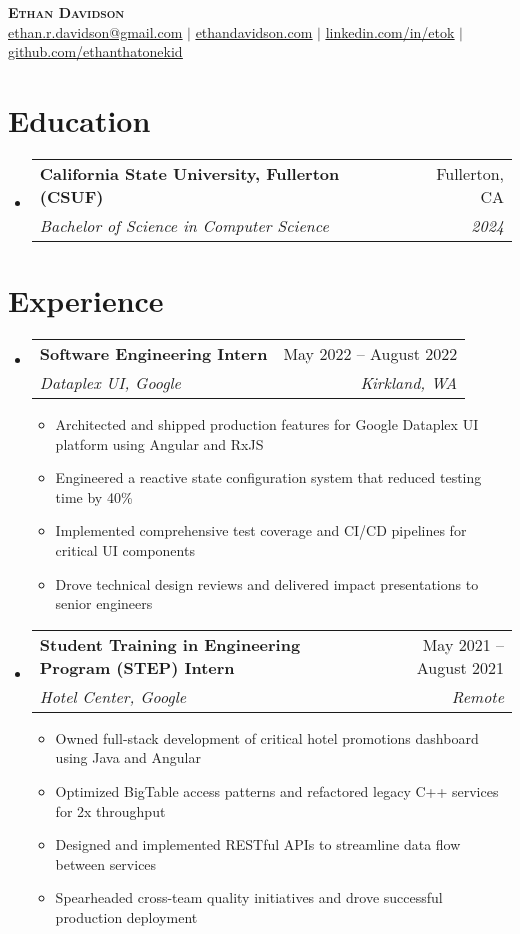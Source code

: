 \documentclass[letterpaper,12pt]{article}
\makeatletter
\newcommand{\resumeItem}[1]{
  \item\small{
    {#1 \vspace{-2pt}}
  }
}
\newcommand{\resumeSubheading}[4]{
  \vspace{-2pt}\item
    \begin{tabular*}{0.97\textwidth}[t]{l@{\extracolsep{\fill}}r}
      \textbf{#1} & #2 \\
      \textit{\small#3} & \textit{\small #4} \\
    \end{tabular*}\vspace{-7pt}
}
\newcommand{\resumeSubHeadingListStart}{\begin{itemize}[leftmargin=0.15in, label={}]}
\newcommand{\resumeSubHeadingListEnd}{\end{itemize}}
\newcommand{\resumeItemListStart}{\begin{itemize}}
\newcommand{\resumeItemListEnd}{\end{itemize}\vspace{-5pt}}
\makeatother
\begin{document}
\begin{center}
  \textbf{\Huge \scshape Ethan Davidson} \\ \vspace{1pt}
  \small \href{mailto:ethan.r.davidson@gmail.com}{\underline{ethan.r.davidson@gmail.com}} $|$ 
  \href{https://etok.me}{\underline{ethandavidson.com}} $|$
  \href{https://linkedin.com/in/etok}{\underline{linkedin.com/in/etok}} $|$
  \href{https://github.com/ethanthatonekid}{\underline{github.com/ethanthatonekid}}
\end{center}

\section{Education}
\resumeSubHeadingListStart
  \resumeSubheading
    {California State University, Fullerton (CSUF)}{Fullerton, CA}
    {Bachelor of Science in Computer Science}{2024}
\resumeSubHeadingListEnd

\section{Experience}
\resumeSubHeadingListStart
  \resumeSubheading
    {Software Engineering Intern}{May 2022 -- August 2022}
    {Dataplex UI, Google}{Kirkland, WA}
    \resumeItemListStart
      \resumeItem{Architected and shipped production features for Google Dataplex UI platform using Angular and RxJS}
      \resumeItem{Engineered a reactive state configuration system that reduced testing time by 40\%}
      \resumeItem{Implemented comprehensive test coverage and CI/CD pipelines for critical UI components}
      \resumeItem{Drove technical design reviews and delivered impact presentations to senior engineers}
    \resumeItemListEnd

  \resumeSubheading
    {Student Training in Engineering Program (STEP) Intern}{May 2021 -- August 2021}
    {Hotel Center, Google}{Remote}
    \resumeItemListStart
      \resumeItem{Owned full-stack development of critical hotel promotions dashboard using Java and Angular}
      \resumeItem{Optimized BigTable access patterns and refactored legacy C++ services for 2x throughput}
      \resumeItem{Designed and implemented RESTful APIs to streamline data flow between services}
      \resumeItem{Spearheaded cross-team quality initiatives and drove successful production deployment}
    \resumeItemListEnd
\resumeSubHeadingListEnd
\end{document}
